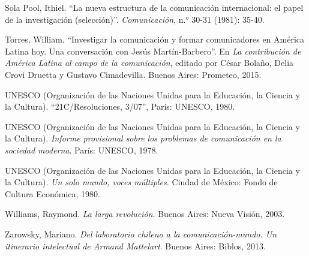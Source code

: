 \documentclass{tufte-handout}
\begin{document}
\begin{hangparas}{.25in}{1}
Sola Pool, Ithiel. ``La nueva estructura de la comunicación
internacional: el papel de la investigación (selección)''.
\emph{Comunicación}, n.° 30-31 (1981): 35-40.

Torres, William. ``Investigar la comunicación y formar comunicadores en
América Latina hoy. Una conversación con Jesús Martín-Barbero''. En
\emph{La contribución de América Latina al campo de la comunicación},
editado por César Bolaño, Delia Crovi Druetta y Gustavo Cimadevilla.
Buenos Aires: Prometeo, 2015.

UNESCO (Organización de las Naciones Unidas para la Educación, la
Ciencia y la Cultura). ``21C/Resoluciones, 3/07'', París: UNESCO, 1980.

UNESCO (Organización de las Naciones Unidas para la Educación, la
Ciencia y la Cultura). \emph{Informe provisional sobre los problemas de
comunicación en la sociedad moderna}. París: UNESCO, 1978.

UNESCO (Organización de las Naciones Unidas para la Educación, la
Ciencia y la Cultura). \emph{Un solo mundo, voces múltiples.} Ciudad de
México: Fondo de Cultura Económica, 1980.

\pagebreak Williams, Raymond. \emph{La larga revolución}. Buenos Aires: Nueva
Visión, 2003.

Zarowsky, Mariano. \emph{Del laboratorio chileno a la
comunicación-mundo. Un itinerario intelectual de Armand Mattelart}.
Buenos Aires: Biblos, 2013.



\end{hangparas}
\end{document}
